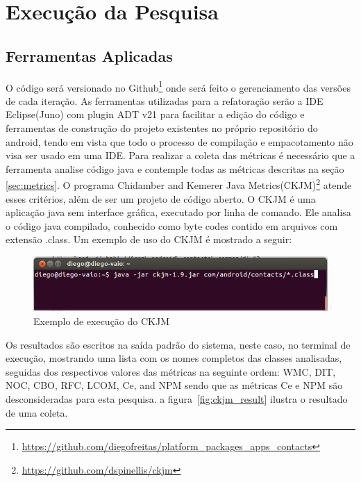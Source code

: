 \chapter{Execução da Pesquisa}


\section{Ferramentas Aplicadas}

O código será versionado no
Github\footnote{\url{https://github.com/diegofreitas/platform_packages_apps_contacts}}
onde será feito o gerenciamento das versões de cada iteração.
As ferramentas utilizadas para a refatoração serão a IDE Eclipse(Juno) com
plugin ADT v21 para facilitar a edição do código e ferramentas de construção
do projeto existentes no próprio repositório do android, tendo em vista que todo
o processo de compilação e empacotamento não visa ser usado em uma IDE.
Para realizar a coleta das métricas é necessário que a ferramenta analise código
java e contemple todas as métricas descritas na seção \ref{sec:metrics}. O
programa Chidamber and Kemerer Java
Metrics(CKJM)\footnote{\url{https://github.com/dspinellis/ckjm}} atende esses
critérios, além de ser um projeto de código aberto. O CKJM é uma aplicação java
sem interface gráfica, executado por linha de comando. Ele analisa o código java
compilado, conhecido como byte codes contido em arquivos com extensão .class. Um
exemplo de uso do CKJM é mostrado a seguir:

\begin{figure}[htb]
	\label{fig:ckjm_run}
	\caption{Exemplo de execução do CKJM} 
	\begin{center}
		\includegraphics[scale=0.5]{img/ckjm_run.png}
	\end{center}
\end{figure}

Os resultados são escritos na saída padrão do sistema, neste caso, no terminal
de execução, mostrando uma lista com os nomes completos das classes
analisadas, seguidas dos respectivos valores das métricas na seguinte
ordem: WMC, DIT, NOC, CBO, RFC, LCOM, Ce, and NPM sendo que as métricas Ce e
NPM são desconsideradas para esta pesquisa. a figura~\ref{fig:ckjm_result}
ilustra o resultado de uma coleta.

